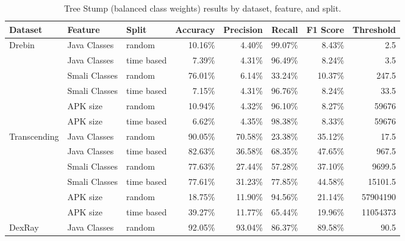 \begin{table*}[t!]
    \begin{minipage}{1.5\textwidth}
        \captionsetup{width=\textwidth}
        \caption{\label{tab:treestump} Tree Stump (balanced class weights) results by dataset, feature, and split.}
    \end{minipage}
    \small
    {\renewcommand{\arraystretch}{1.5} %
        \begin{tabularx}{\linewidth}{@{}l l l r r r r r@{}} %
            \toprule
            \textbf{Dataset} & \textbf{Feature} & \textbf{Split} & \textbf{Accuracy} & \textbf{Precision} & \textbf{Recall} & \textbf{F1 Score} & \textbf{Threshold} \\
            \midrule
            Drebin & Java Classes & random     & 10.16\% & 4.40\% & 99.07\% & 8.43\% & 2.5 \\
                   & Java Classes & time based & 7.39\%  & 4.31\% & 96.49\% & 8.24\% & 3.5 \\
                   & Smali Classes & random    & 76.01\% & 6.14\% & 33.24\% & 10.37\% & 247.5 \\
                   & Smali Classes & time based & 7.15\%  & 4.31\% & 96.76\% & 8.24\% & 33.5 \\
                   & APK size     & random     & 10.94\% & 4.32\% & 96.10\% & 8.27\% & 59676 \\
                   & APK size & time based & 6.62\%  & 4.35\% & 98.38\% & 8.33\% & 59676 \\
            \midrule
            Transcending & Java Classes & random     & 90.05\% & 70.58\% & 23.38\% & 35.12\% & 17.5 \\
                         & Java Classes & time based & 82.63\% & 36.58\% & 68.35\% & 47.65\% & 967.5 \\
                         & Smali Classes & random    & 77.63\% & 27.44\% & 57.28\% & 37.10\% & 9699.5 \\
                         & Smali Classes & time based & 77.61\% & 31.23\% & 77.85\% & 44.58\% & 15101.5 \\
                         & APK size     & random     & 18.75\% & 11.90\% & 94.56\% & 21.14\% & 57904190 \\
                         & APK size & time based & 39.27\% & 11.77\% & 65.44\% & 19.96\% & 11054373 \\
            \midrule
            DexRay & Java Classes & random     & 92.05\% & 93.04\% & 86.37\% & 89.58\% & 90.5 \\

\end{tabularx}}
\end{table*}
